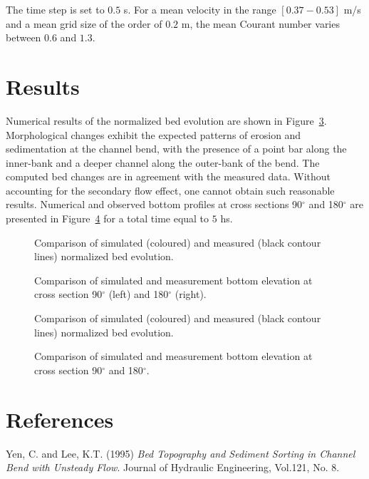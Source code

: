 The time step is set to $0.5$ s. For a mean velocity in the range $[0.37-0.53]$ m/s and
a mean grid size of the order of $0.2$ m, the mean Courant number varies between $0.6$ and $1.3$.

\section{Results}
%
Numerical results of the normalized bed evolution are shown in Figure~\ref{fig:results1}. Morphological changes exhibit the expected
patterns of erosion and sedimentation at the channel bend, with the presence of a point bar along the inner-bank and a deeper channel along the outer-bank of the bend.
The computed bed changes are in agreement with the measured data. Without accounting for the secondary flow effect, one cannot obtain such reasonable results.
Numerical and observed bottom profiles at cross sections 90$^{\circ}$ and 180$^{\circ}$ are presented in Figure~\ref{fig:results2} for a total time equal to $5$ hs.


\begin{figure} [!h]
\centering
{}
 \caption{Comparison of simulated (coloured) and measured (black contour lines) normalized bed evolution.}\label{fig:results1}
\end{figure}

\begin{figure} [!h]
\centering
{}
 \caption{Comparison of simulated and measurement bottom elevation at cross section 90$^{\circ}$ (left) and 180$^{\circ}$ (right).}\label{fig:results2}
\end{figure}
\begin{figure} [!h]
\centering
{}
 \caption{Comparison of simulated (coloured) and measured (black contour lines) normalized bed evolution.}\label{fig:results1}
\end{figure}

\begin{figure} [!h]
\centering
{}
 \caption{Comparison of simulated and measurement bottom elevation at cross section 90$^{\circ}$ and 180$^{\circ}$.}\label{fig:results2}
\end{figure}



\section{References}
%
Yen, C. and Lee, K.T. (1995) \textit{ Bed Topography and Sediment Sorting in Channel Bend
with Unsteady Flow}. Journal of Hydraulic Engineering, Vol.121, No. 8.
